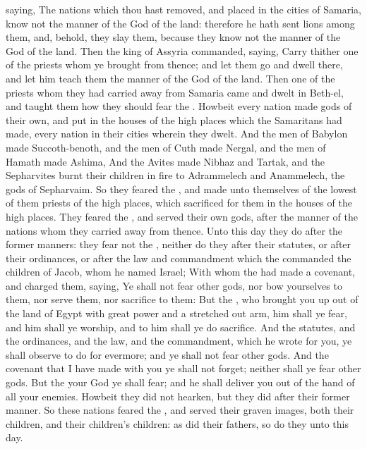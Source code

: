 {saying, The
nations which thou hast
removed, and
placed in the
cities of
Samaria,
know not the
manner of the
God of the
land: therefore he hath
sent
lions among them, and, behold, they
slay them, because they
know not the
manner of the
God of the
land.
Then the
king of
Assyria
commanded,
saying,
Carry thither
one of the
priests whom ye
brought from thence; and let them
go and
dwell there, and let him
teach them the
manner of the
God of the
land.
Then
one of the
priests whom they had carried
away from
Samaria
came and
dwelt in
Beth-el, and
taught them how they should
fear the
{}.
Howbeit every
nation
made
gods of their own, and
put
{} in the
houses of the high
places which the
Samaritans had
made, every
nation in their
cities wherein they
dwelt.
And the
men of
Babylon
made
Succoth-benoth, and the
men of
Cuth
made
Nergal, and the
men of
Hamath
made
Ashima,
And the
Avites
made
Nibhaz and
Tartak, and the
Sepharvites
burnt their
children in
fire to
Adrammelech and
Anammelech, the
gods of
Sepharvaim.
So they
feared the
{}, and
made unto themselves of the
lowest of them
priests of the high
places, which
sacrificed for them in the
houses of the high
places.
They
feared the
{}, and
served their own
gods, after the
manner of the
nations whom they carried
away from thence.
Unto this
day they
do after the
former
manners: they
fear not the
{}, neither
do they after their
statutes, or after their
ordinances, or after the
law and
commandment which the
{}
commanded the
children of
Jacob, whom he
named
Israel;
With whom the
{} had
made a
covenant, and
charged them,
saying, Ye shall not
fear
other
gods, nor
bow yourselves to them, nor
serve them, nor
sacrifice to them:
But the
{}, who brought you
up out of the
land of
Egypt with
great
power and a stretched
out
arm, him shall ye
fear, and him shall ye
worship, and to him shall ye do
sacrifice.
And the
statutes, and the
ordinances, and the
law, and the
commandment, which he
wrote for you, ye shall
observe to
do for
evermore; and ye shall not
fear
other
gods.
And the
covenant that I have
made with you ye shall not
forget; neither shall ye
fear
other
gods.
But the
{} your
God ye shall
fear; and he shall
deliver you out of the
hand of all your
enemies.
Howbeit they did not
hearken, but they
did after their
former
manner.
So these
nations
feared the
{}, and
served their graven
images, both their
children, and their
children’s
children: as
did their
fathers, so
do they unto this
day.

}
